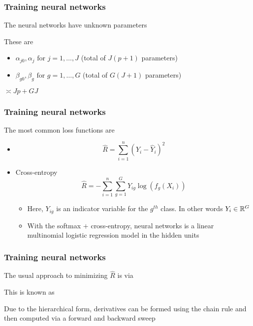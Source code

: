 \documentclass[12pt]{beamer}
\begin{document}
\begin{frame}[fragile]
\frametitle{Training neural networks}
The neural networks have  unknown parameters


\vsp
These are
\begin{itemize}
\item $\alpha_{j0}, \alpha_j \textrm{ for } j = 1,\ldots,J$ (total of $J(p+1)$ parameters)
\item $\beta_{g0}, \beta_g \textrm{ for } g = 1,\ldots,G$ (total of $G(J+1)$ parameters)
\end{itemize}
\vsp

 $\asymp Jp + GJ$
\end{frame}

\begin{frame}[fragile]
\frametitle{Training neural networks}
The most common loss functions are
\begin{itemize}
\item {} 
\[
\hat{R} = \sum_{i = 1}^n (Y_i - \hat{Y}_i)^2
\]
\item {}  Cross-entropy
\[
\hat{R} = -\sum_{i = 1}^n \sum_{g=1}^G Y_{ig} \log( f_g(X_i))
\]
\begin{itemize}
\item Here, $Y_{ig}$ is an indicator variable for the $g^{th}$ class.  In other words $Y_i \in \mathbb{R}^G$

\item With the softmax $+$ cross-entropy, neural networks is a linear multinomial logistic regression model in the
hidden units
\end{itemize}
\end{itemize}

\end{frame}

\begin{frame}[fragile]
\frametitle{Training neural networks}
The usual approach to minimizing $\hat{R}$ is via 

\vsp
This is known as 

\vsp
Due to the hierarchical form, derivatives can be formed using the chain rule and
then computed via a forward and backward sweep 
\end{frame}
\end{document}
